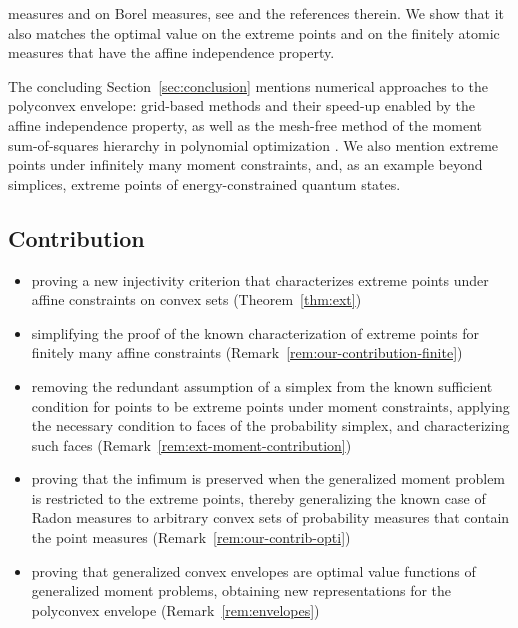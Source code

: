 \documentclass[a4paper,11pt,reqno]{amsart}
\numberwithin{equation}{section}
\theoremstyle{plain}
\theoremstyle{definition}
\begin{document}
measures \cite{dacorogna08} and on Borel measures, see \cite{fantuzzi-etal26} and 
the references therein. We show that it also matches the optimal value on the 
extreme points and on the finitely atomic measures that have the affine 
independence property.
\par
%
The concluding Section~\ref{sec:conclusion} mentions numerical approaches to the
polyconvex envelope: grid-based methods \cite{bartels05} and their speed-up enabled 
by the affine independence property, as well as the mesh-free method 
of the moment sum-of-squares hierarchy in polynomial optimization 
\cite{fantuzzi-etal26}. We also mention extreme points under infinitely many moment 
constraints, and, as an example beyond simplices, extreme points of 
energy-constrained quantum states.
\par
%
\subsection*{Contribution}
\begin{itemize}
\item 
proving a new injectivity criterion that characterizes extreme points under affine 
constraints on convex sets (Theorem~\ref{thm:ext})
%
\item 
simplifying the proof of the known characterization of extreme points for finitely 
many affine constraints (Remark~\ref{rem:our-contribution-finite})
%
\item 
removing the redundant assumption of a simplex from the known sufficient condition 
for points to be extreme points under moment constraints, applying the necessary 
condition to faces of the probability simplex, and characterizing such faces
(Remark~\ref{rem:ext-moment-contribution})
%
\item 
proving that the infimum is preserved when the generalized moment problem is 
restricted to the extreme points, thereby generalizing the known case of Radon measures to 
arbitrary convex sets of probability measures that contain the point measures 
(Remark~\ref{rem:our-contrib-opti})
%
\item 
proving that generalized convex envelopes are optimal value functions of generalized moment 
problems, obtaining new representations for the polyconvex envelope 
(Remark~\ref{rem:envelopes})
\end{itemize}   
%
%
\end{document}
